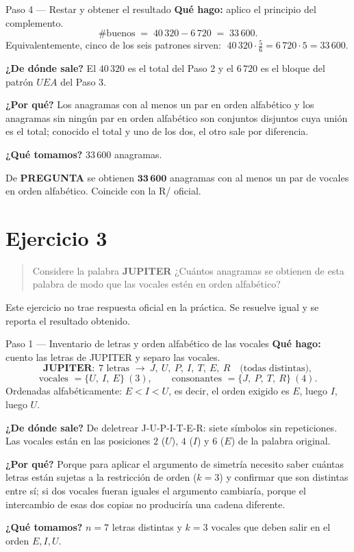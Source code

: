 \documentclass[11pt]{article}
\begin{document}
\begin{paso}{Paso 4 --- Restar y obtener el resultado}
\textbf{Qué hago:} aplico el principio del complemento.
\[
\#\text{buenos} \;=\; 40\,320 - 6\,720 \;=\; 33\,600.
\]
Equivalentemente, cinco de los seis patrones sirven:
$\;40\,320\cdot\frac{5}{6} = 6\,720\cdot 5 = 33\,600$.

\textbf{¿De dónde sale?} El $40\,320$ es el total del Paso 2 y el $6\,720$ es el bloque del patrón $UEA$ del
Paso 3.

\textbf{¿Por qué?} Los anagramas con al menos un par en orden alfabético y los anagramas sin ningún par en
orden alfabético son conjuntos disjuntos cuya unión es el total; conocido el total y uno de los dos, el otro
sale por diferencia.

\textbf{¿Qué tomamos?} $33\,600$ anagramas.
\end{paso}

\begin{resp}
De \textbf{PREGUNTA} se obtienen $\mathbf{33\,600}$ anagramas con al menos un par de vocales en orden
alfabético. Coincide con la R/ oficial.
\end{resp}

\section*{Ejercicio 3}

\begin{quote}
Considere la palabra \textbf{JUPITER} ¿Cuántos anagramas se obtienen de esta palabra de modo que las vocales
estén en orden alfabético?
\end{quote}

\begin{nota}
Este ejercicio no trae respuesta oficial en la práctica. Se resuelve igual y se reporta el resultado
obtenido.
\end{nota}

\begin{paso}{Paso 1 --- Inventario de letras y orden alfabético de las vocales}
\textbf{Qué hago:} cuento las letras de JUPITER y separo las vocales.
\[
\textbf{JUPITER}:\ 7 \text{ letras } \to\ J,\ U,\ P,\ I,\ T,\ E,\ R \quad\text{(todas distintas)},
\]
\[
\text{vocales } = \{U,\ I,\ E\}\ (3),\qquad \text{consonantes } = \{J,\ P,\ T,\ R\}\ (4).
\]
Ordenadas alfabéticamente: $E < I < U$, es decir, el orden exigido es $E$, luego $I$, luego $U$.

\textbf{¿De dónde sale?} De deletrear J-U-P-I-T-E-R: siete símbolos sin repeticiones. Las vocales están en
las posiciones $2$ ($U$), $4$ ($I$) y $6$ ($E$) de la palabra original.

\textbf{¿Por qué?} Porque para aplicar el argumento de simetría necesito saber cuántas letras están sujetas
a la restricción de orden ($k=3$) y confirmar que son distintas entre sí; si dos vocales fueran iguales el
argumento cambiaría, porque el intercambio de esas dos copias no produciría una cadena diferente.

\textbf{¿Qué tomamos?} $n=7$ letras distintas y $k=3$ vocales que deben salir en el orden $E,I,U$.
\end{paso}
\end{document}
